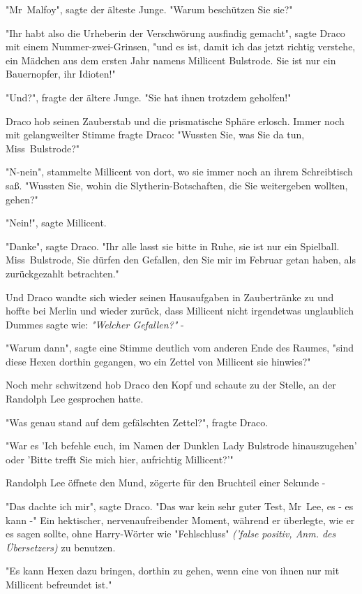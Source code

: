 {"Mr~Malfoy", sagte der älteste Junge. "Warum beschützen Sie sie?"

"Ihr habt also die Urheberin der Verschwörung ausfindig gemacht", sagte Draco mit einem Nummer-zwei-Grinsen, "und es ist, damit ich das jetzt richtig verstehe, ein Mädchen aus dem ersten Jahr namens Millicent Bulstrode. Sie ist nur ein Bauernopfer, ihr Idioten!"

"Und?", fragte der ältere Junge. "Sie hat ihnen trotzdem geholfen!"

Draco hob seinen Zauberstab und die prismatische Sphäre erlosch. Immer noch mit gelangweilter Stimme fragte Draco: "Wussten Sie, was Sie da tun, Miss~Bulstrode?"

"N-nein", stammelte Millicent von dort, wo sie immer noch an ihrem Schreibtisch saß. "Wussten Sie, wohin die Slytherin-Botschaften, die Sie weitergeben wollten, gehen?"

"Nein!", sagte Millicent.

"Danke", sagte Draco. "Ihr alle lasst sie bitte in Ruhe, sie ist nur ein Spielball. Miss~Bulstrode, Sie dürfen den Gefallen, den Sie mir im Februar getan haben, als zurückgezahlt betrachten."

Und Draco wandte sich wieder seinen Hausaufgaben in Zaubertränke zu und hoffte bei Merlin und wieder zurück, dass Millicent nicht irgendetwas unglaublich Dummes sagte wie: \emph{"Welcher Gefallen?"} -

"Warum dann", sagte eine Stimme deutlich vom anderen Ende des Raumes, "sind diese Hexen dorthin gegangen, wo ein Zettel von Millicent sie hinwies?"

Noch mehr schwitzend hob Draco den Kopf und schaute zu der Stelle, an der Randolph Lee gesprochen hatte.

"Was genau stand auf dem gefälschten Zettel?", fragte Draco.

"War es 'Ich befehle euch, im Namen der Dunklen Lady Bulstrode hinauszugehen' oder 'Bitte trefft Sie mich hier, aufrichtig Millicent?'"

Randolph Lee öffnete den Mund, zögerte für den Bruchteil einer Sekunde -

"Das dachte ich mir", sagte Draco. "Das war kein sehr guter Test, Mr~Lee, es - es kann -" Ein hektischer, nervenaufreibender Moment, während er überlegte, wie er es sagen sollte, ohne Harry-Wörter wie "Fehlschluss" \emph{('false positiv, Anm. des Übersetzers)} zu benutzen.

"Es kann Hexen dazu bringen, dorthin zu gehen, wenn eine von ihnen nur mit Millicent befreundet ist."

}
